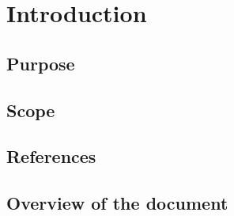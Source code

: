 \chapter{Introduction} \label{chap:introduction}


\section{Purpose}
\lipsum[1]


\section{Scope}
\lipsum[2]




\section{References}
\lipsum[4]


\section{Overview of the document}	
\lipsum[5]